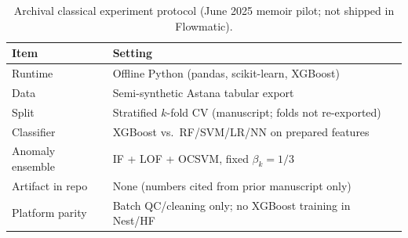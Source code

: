 \begin{table}[H]
  \centering
  \caption{Archival classical experiment protocol (June 2025 memoir pilot; not shipped in Flowmatic).}
  \label{tab:classical_protocol}
  \small
  \begin{tabular}{@{}ll@{}}
    \toprule
    \textbf{Item} & \textbf{Setting} \\
    \midrule
    Runtime & Offline Python (pandas, scikit-learn, XGBoost) \\
    Data & Semi-synthetic Astana tabular export \\
    Split & Stratified $k$-fold CV (manuscript; folds not re-exported) \\
    Classifier & XGBoost vs.\ RF/SVM/LR/NN on prepared features \\
    Anomaly ensemble & IF + LOF + OCSVM, fixed $\beta_k = 1/3$ \\
    Artifact in repo & None (numbers cited from prior manuscript only) \\
    Platform parity & Batch QC/cleaning only; no XGBoost training in Nest/HF \\
    \bottomrule
  \end{tabular}
\end{table}
